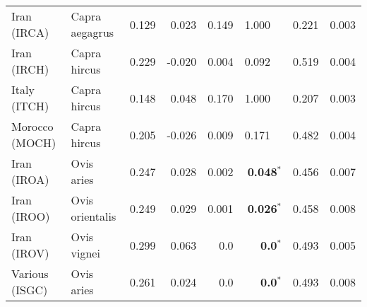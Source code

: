 \begin{center}
\begin{adjustbox}{width = 1\textwidth}
\begin{tabular}{|l|l|r|r|r|r|r|r|}
                    Iran (IRCA) &       Capra aegagrus &                                              0.129 &                                              0.023 &            0.149 &                         1.000~~ &                                              0.221 &              0.003 \\
                    Iran (IRCH) &         Capra hircus &                                              0.229 &                                             -0.020 &            0.004 &                         0.092~~ &                                              0.519 &              0.004 \\
                   Italy (ITCH) &         Capra hircus &                                              0.148 &                                              0.048 &            0.170 &                         1.000~~ &                                              0.207 &              0.003 \\
                 Morocco (MOCH) &         Capra hircus &                                              0.205 &                                             -0.026 &            0.009 &                         0.171~~ &                                              0.482 &              0.004 \\
                    Iran (IROA) &           Ovis aries &                                              0.247 &                                              0.028 &            0.002 &                  \textbf{0.048}$\bm{^*}$ &                                              0.456 &              0.007 \\
                    Iran (IROO) &      Ovis orientalis &                                              0.249 &                                              0.029 &            0.001 &                  \textbf{0.026}$\bm{^*}$ &                                              0.458 &              0.008 \\
                    Iran (IROV) &          Ovis vignei &                                              0.299 &                                              0.063 &              0.0 &                    \textbf{0.0}$\bm{^*}$ &                                              0.493 &              0.005 \\
                 Various (ISGC) &           Ovis aries &                                              0.261 &                                              0.024 &              0.0 &                    \textbf{0.0}$\bm{^*}$ &                                              0.493 &              0.008 \\

\end{tabular}
\end{adjustbox}
\end{center}
